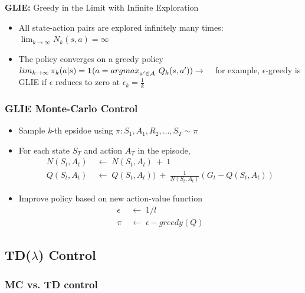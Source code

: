 \documentclass[10pt]{article}
\begin{document}
\newpage
\textbf{GLIE:} Greedy in the Limit with Infinite Exploration
\begin{itemize}
\item All state-action pairs are explored infinitely many times: \\
$\mathop{lim}_{k \rightarrow \infty} N_{k} (s, a) = \infty$
\item The policy converges on a greedy policy \\
$\mathop{lim}_{k \rightarrow \infty} \pi_{k}(a|s) = \mathbf{1}(a = \mathop{argmax}_{a' \in \mathcal{A}}\: Q_{k}(s, a')) \\ \\
\rightarrow \quad$ for example, $\epsilon$-greedy is GLIE if $\epsilon$ reduces to zero at $\epsilon_{k} = \frac{1}{k}$
\end{itemize}

\subsubsection*{GLIE Monte-Carlo Control}

\begin{itemize}
\item Sample \textit{k}-th epsidoe using $\pi: {S_{1}, A_{1}, R_{2}, \ldots, S_{T} } \sim \pi$
\item For each state $S_{T}$ and action $A_{T}$ in the episode,
\begin{align*}
N(S_{t}, A_{t}) \; &\leftarrow \; N(S_{t}, A_{t}) \: + \: 1 \\
Q(S_{t}, A_{t}) \; &\leftarrow \; Q(S_{t}, A_{t})) \: + \: \frac{1}{N(S_{t}, A_{t})} (G_{t} - Q(S_{t}, A_{t}))
\end{align*}
\item Improve policy based on new action-value function
\begin{align*}
 \epsilon \; &\leftarrow \; 1/l \\ \pi \; &\leftarrow \;  \epsilon - greedy(Q)	
\end{align*}
\end{itemize}

\subsection{TD($\lambda$) Control}

\subsubsection*{MC vs. TD control}
\end{document}

